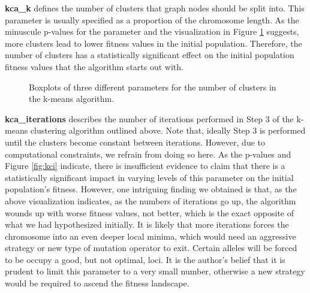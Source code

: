 \documentclass[12pt,twocolumn,oneside]{osajnl}
\begin{document}
\textbf{kca\_k} defines the number of clusters that graph nodes should be split into. This parameter is usually specified as a proportion of the chromosome length. As the minuscule p-values for the parameter and the visualization in Figure \ref{fig:kcai} suggests,  more clusters lead to lower fitness values in the initial population. Therefore, the number of clusters has a statistically significant effect on the initial population fitness values that the algorithm starts out with.

\begin{figure}[htbp]
\centering
{}
\caption{Boxplots of three different parameters for the number of clusters in the k-means algorithm.}
\label{fig:kcai}
\end{figure}

\textbf{kca\_iterations} describes the number of iterations performed in Step 3 of the k-means clustering algorithm outlined above. Note that, ideally Step 3 is performed until the clusters become constant between iterations. However, due to computational constraints, we refrain from doing so here. As the p-values and Figure \ref{fig:kci} indicate, there is insufficient evidence to claim that there is a statistically significant impact in varying levels of this parameter on the initial population’s fitness. However, one intriguing finding we obtained is that, as the above visualization indicates, as the numbers of iterations go up, the algorithm wounds up with worse fitness values, not better, which is the exact opposite of what we had hypothesized initially.
It is likely that more iterations forces the chromosome into an even deeper local minima, which would need an aggressive strategy or new type of mutation operator to exit. Certain alleles will be forced to be occupy a good, but not optimal, loci. It is the author's belief that it is prudent to limit this parameter to a very small number, otherwise a new strategy would be required to ascend the fitness landscape.
\end{document}
